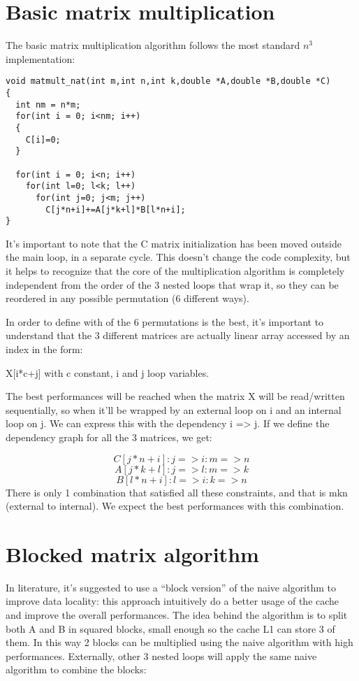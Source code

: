 \section{Basic matrix multiplication}
The basic matrix multiplication algorithm follows the most standard $n^3$ implementation:

\begin{lstlisting}
void matmult_nat(int m,int n,int k,double *A,double *B,double *C)
{
  int nm = n*m;
  for(int i = 0; i<nm; i++)  
  {
    C[i]=0;
  }

  for(int i = 0; i<n; i++)  
    for(int l=0; l<k; l++)
      for(int j=0; j<m; j++)
        C[j*n+i]+=A[j*k+l]*B[l*n+i];
}
\end{lstlisting}

It’s important to note that the C matrix initialization has been moved outside the main loop, in a separate cycle. This doesn’t change the code complexity, but it helps to recognize that the core of the multiplication algorithm is completely independent from the order of the 3 nested loops that wrap it, so they can be reordered in any possible permutation (6 different ways).

In order to define with of the 6 permutations is the best, it’s important to understand that the 3 different matrices are actually linear array accessed by an index in the form:

X[i*c+j] with c constant, i and j loop variables.

The best performances will be reached when the matrix X will be read/written sequentially, so when it’ll be wrapped by an external loop on i and an internal loop on j. We can express this with the dependency i => j.
If we define the dependency graph for all the 3 matrices, we get:

$$
C[j*n+i] : j => i : m => n 
$$
$$
A[j*k+l] : j => l : m => k 
$$
$$
B[l*n+i] : l => i : k => n
$$
There is only 1 combination that satisfied all these constraints, and that is mkn (external to internal). We expect the best performances with this combination.

\section{Blocked matrix algorithm}

In literature, it’s suggested to use a “block version” of the naive algorithm to improve data locality: this approach intuitively do a better usage of the cache and improve the overall performances.
The idea behind the algorithm is to split both A and B in squared blocks, small enough so the cache L1 can store 3 of them. In this way 2 blocks can be multiplied using the naive algorithm with high performances.
Externally, other 3 nested loops will apply the same naive algorithm to combine the blocks:

